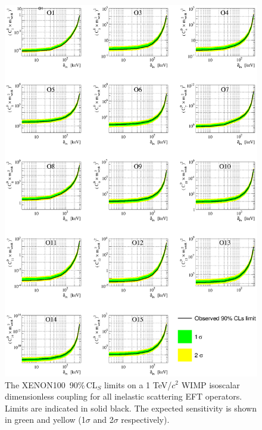 \documentclass[twocolumn, showpacs, showkeys, amsmath, amssymb, amsfonts, floatfix, linenumbers]{revtex4-1}
\newcommand{\Xehund}{{XENON100}}
\begin{document}
\begin{figure}
\begin{minipage}{1.\linewidth}
\centerline{\includegraphics[width=\textwidth,height=0.99\textheight,keepaspectratio]{Figures/FinalInelastic.eps}}
\end{minipage}
\caption{The \Xehund\ 90\%\,CL$_S$ limits on a 1 TeV/$c^2$ WIMP isoscalar dimensionless coupling for all inelastic scattering EFT operators. Limits are indicated in solid black. The expected sensitivity is shown in green and yellow (1$\sigma$ and 2$\sigma$ respectively).}
\label{fig:InelasticLimit}
\end{figure}




%


\end{document}
